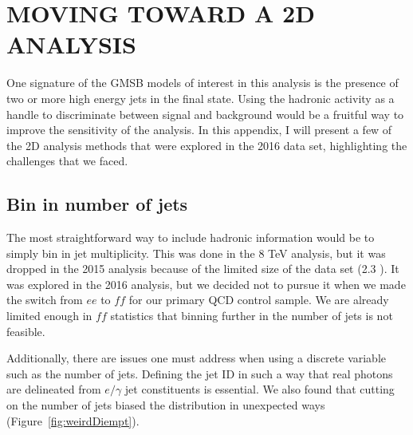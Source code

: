\chapter{MOVING TOWARD A 2D ANALYSIS}
\label{app:2D}

One signature of the GMSB models of interest in this analysis
is the presence of two or more high energy jets in the final state.
Using the hadronic activity as a handle to discriminate between signal and background
would be a fruitful way to improve the sensitivity of the analysis. 
In this appendix, I will present a few of the 2D analysis methods
that were explored in the 2016 data set, highlighting the challenges 
that we faced. 

\section{Bin in number of jets}
The most straightforward way to include hadronic information
would be to simply bin in jet multiplicity.
This was done in the 8 TeV analysis, but it was dropped in the 
2015 analysis because of the limited size of the data set (2.3 \fbinv).
It was explored in the 2016 analysis, but we decided not 
to pursue it when we made the switch from $ee$ to $ff$ for our 
primary QCD control sample. We are 
already limited enough in $ff$ statistics that binning further 
in the number of jets is not feasible. 

Additionally, there are issues one must address when using 
a discrete variable such as the number of jets. Defining the 
jet ID in such a way that real photons are delineated from 
$e/\gamma$ jet constituents is essential. We also found
that cutting on the number of jets biased the \diempt distribution
in unexpected ways (Figure~\ref{fig:weirdDiempt}).

